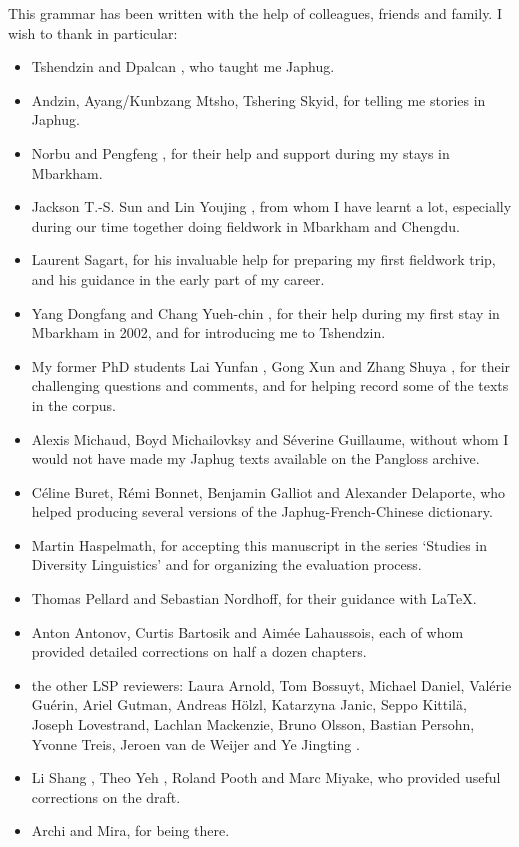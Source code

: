 %
%

This grammar has been written with the help of colleagues, friends and family. I wish to thank in particular:

\begin{itemize}
	\item Tshendzin  and  Dpalcan , who taught me Japhug.
	\item Andzin, Ayang/Kunbzang Mtsho,   Tshering Skyid, for telling me stories in Japhug.
	\item Norbu  and Pengfeng , for their help and support during my stays in Mbarkham.
	\item Jackson T.-S. Sun  and Lin Youjing , from whom I have learnt a lot, especially during our time together doing fieldwork in Mbarkham and Chengdu.	
	\item Laurent Sagart, for his invaluable help for preparing my first fieldwork trip, and his guidance in the early part of my career.
	\item 	Yang Dongfang  and Chang Yueh-chin , for their help during my first stay in Mbarkham in 2002, and for introducing me to Tshendzin.
	\item My former PhD students Lai Yunfan , Gong Xun  and Zhang Shuya , for their challenging questions and comments, and for helping record some of the texts in the corpus.
	\item Alexis Michaud, Boyd Michailovksy and Séverine Guillaume, without whom I would not have made my Japhug texts available on the Pangloss archive.
	\item Céline Buret, Rémi Bonnet, Benjamin Galliot and Alexander Delaporte, who helped producing several versions of the Japhug-French-Chinese dictionary.
	\item Martin Haspelmath, for accepting this manuscript in the series `Studies in Diversity Linguistics' and for organizing the evaluation process.
	\item Thomas Pellard and Sebastian Nordhoff, for their guidance with \LaTeX.
	\item Anton Antonov, Curtis Bartosik and Aimée Lahaussois, each of whom provided detailed corrections on half a dozen chapters.
	\item the other LSP reviewers: Laura Arnold, Tom Bossuyt, Michael Daniel, Valérie Guérin, Ariel Gutman, Andreas Hölzl, Katarzyna Janic, Seppo Kittilä, Joseph Lovestrand, Lachlan Mackenzie, Bruno Olsson, Bastian Persohn, Yvonne Treis, Jeroen van de Weijer and Ye Jingting  .
	\item Li Shang , Theo Yeh , Roland Pooth and Marc Miyake, who provided useful corrections on the draft.
	\item Archi and Mira, for being there.
\end{itemize}
